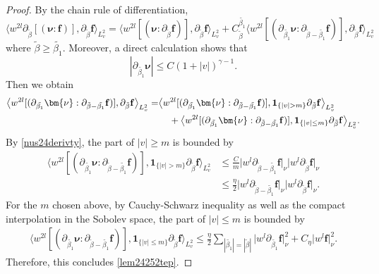 \documentclass[reqno]{amsart}
\numberwithin{equation}{section}
\numberwithin{equation}{section}
\begin{document}
	\begin{proof}
		By the chain rule of differentiation, 
		\begin{equation}\label{zzzdbbl}
			\big\langle w^{2l}  \partial_{\tilde{\beta}}[(\bm{\nu}:\mathbf{f})], \partial_{\tilde{\beta}} \mathbf{f} \big\rangle_{L_v^2}=\big\langle w^{2l}  [(\bm{\nu}:\partial_{\tilde{\beta}}\mathbf{f})], \partial_{\tilde{\beta}} \mathbf{f} \big\rangle_{L_v^2}+C_{\tilde{\beta}}^{\tilde{\beta_1}}\big\langle w^{2l}  [(\partial_{\tilde{\beta_1}}\bm{\nu}:\partial_{\tilde{\beta}-\tilde{\beta_1}}\mathbf{f})], \partial_{\tilde{\beta}} \mathbf{f} \big\rangle_{L_v^2}
		\end{equation}
		where $\tilde{\beta}\geq\tilde{\beta_1}$. Moreover, a direct calculation shows that
		\begin{equation}\label{nus24derivty}
			|\partial_{\tilde{\beta_1}}\bm{\nu}| \leq C (1+|v|)^{\gamma-1}.
		\end{equation}
		Then we obtain
		\begin{align*}
			\big\langle w^{2l}  [(\partial_{\tilde{\beta_1}}\bm{\nu}:\partial_{\tilde{\beta}-\tilde{\beta_1}}\mathbf{f})], \partial_{\tilde{\beta}} \mathbf{f} \big\rangle_{L_v^2} =& \big\langle w^{2l}  [(\partial_{\tilde{\beta_1}}\bm{\nu}:\partial_{\tilde{\beta}-\tilde{\beta_1}}\mathbf{f})], \mathbf{1}_{\{|v|>m\}}\partial_{\tilde{\beta}} \mathbf{f} \big\rangle_{L_v^2}\\
			&\hspace{0.4cm}+\big\langle w^{2l}  [(\partial_{\tilde{\beta_1}}\bm{\nu}:\partial_{\tilde{\beta}-\tilde{\beta_1}}\mathbf{f})], \mathbf{1}_{\{|v|\leq m\}}\partial_{\tilde{\beta}} \mathbf{f} \big\rangle_{L_v^2}.
		\end{align*}
		By \eqref{nus24derivty}, the part of $|v|\geq m$ is bounded by
		\begin{align*}
			\big\langle w^{2l}  [(\partial_{\tilde{\beta_1}}\bm{\nu}:\partial_{\tilde{\beta}-\tilde{\beta_1}}\mathbf{f})], \mathbf{1}_{\{|v|>m\}}\partial_{\tilde{\beta}} \mathbf{f} \big\rangle_{L_v^2} &\leq \frac{C}{m} \big|w^{l}\partial_{\tilde{\beta}-\tilde{\beta_1}}\mathbf{f}\big|_{\nu} \big|w^{l}\partial_{\tilde{\beta}}\mathbf{f}\big|_{\nu} \\
			& \leq  \frac{\eta}{2} \big|w^{l}\partial_{\tilde{\beta}-\tilde{\beta_1}}\mathbf{f}\big|_{\nu} \big|w^{l}\partial_{\tilde{\beta}}\mathbf{f}\big|_{\nu}.
		\end{align*}
		For the $m$ chosen above, by Cauchy-Schwarz inequality as well as the compact interpolation in the Sobolev space, the part of $|v|\leq m$ is bounded by
		\begin{align*}
			\big\langle w^{2l}  [(\partial_{\tilde{\beta_1}}\bm{\nu}:\partial_{\tilde{\beta}-\tilde{\beta_1}}\mathbf{f})], \mathbf{1}_{\{|v|\leq m\}}\partial_{\tilde{\beta}} \mathbf{f} \big\rangle_{L_v^2} \leq \frac{\eta}{2} \sum_{|\tilde{\beta_1}|=|\tilde{\beta}|} \big|w^{l}\partial_{\tilde{\beta_1}}\mathbf{f}\big|_{\nu}^2 + C_{\eta} \big|w^{l}\mathbf{f}\big|_{\nu}^2.
		\end{align*}
		Therefore, this concludes \eqref{lem24252tep}.
		

\end{proof}
\end{document}
